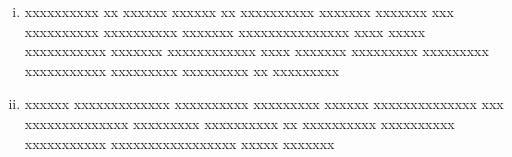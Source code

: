 \begin{enumerate}[(i)]
  \item xxxxxxxxxx xx xxxxxx xxxxxx xx xxxxxxxxxx xxxxxxx xxxxxxx xxx
    xxxxxxxxxx xxxxxxxxxx xxxxxxx xxxxxxxxxxxxxxx xxxx xxxxx xxxxxxxxxxx xxxxxxx
    xxxxxxxxxxxx xxxx xxxxxxx xxxxxxxxx xxxxxxxxx xxxxxxxxxxx xxxxxxxxx xxxxxxxxx
    xx xxxxxxxxx
  \item xxxxxx xxxxxxxxxxxxx xxxxxxxxxx xxxxxxxxx xxxxxx xxxxxxxxxxxxxx xxx
    xxxxxxxxxxxxxx xxxxxxxxx xxxxxxxxxx xx xxxxxxxxxx xxxxxxxxxx xxxxxxxxxxx
    xxxxxxxxxxxxxxxxx xxxxx xxxxxxx
\end{enumerate}
